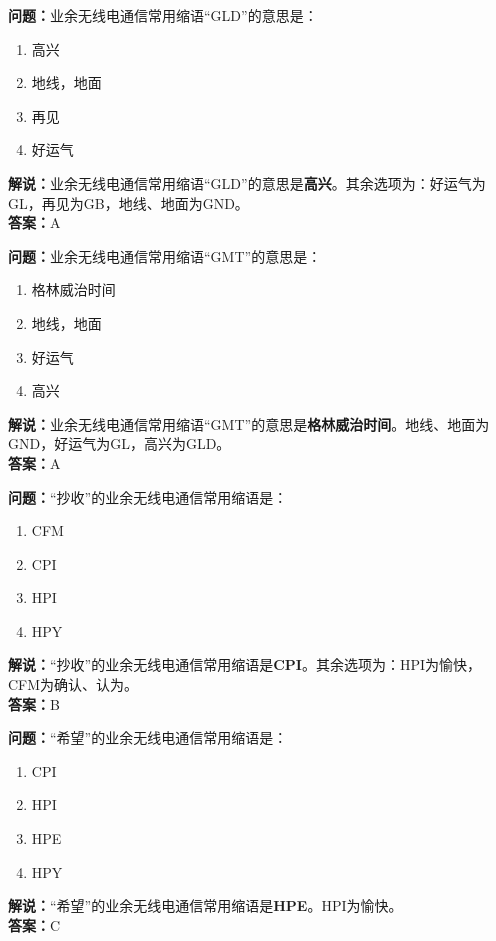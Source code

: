 \bigskip


\noindent\textbf{问题：}业余无线电通信常用缩语“GLD”的意思是：
\begin{enumerate}[label=\Alph*), leftmargin=3em]
\item 高兴
\item 地线，地面
\item 再见
\item 好运气
\end{enumerate}
\noindent\textbf{解说：}业余无线电通信常用缩语“GLD”的意思是\textbf{高兴}。其余选项为：好运气为GL，再见为GB，地线、地面为GND。\\\noindent\textbf{答案：}A



\bigskip


\noindent\textbf{问题：}业余无线电通信常用缩语“GMT”的意思是：
\begin{enumerate}[label=\Alph*), leftmargin=3em]
\item 格林威治时间
\item 地线，地面
\item 好运气
\item 高兴
\end{enumerate}
\noindent\textbf{解说：}业余无线电通信常用缩语“GMT”的意思是\textbf{格林威治时间}。地线、地面为GND，好运气为GL，高兴为GLD。\\\noindent\textbf{答案：}A



\bigskip


\noindent\textbf{问题：}“抄收”的业余无线电通信常用缩语是：
\begin{enumerate}[label=\Alph*), leftmargin=3em]
\item CFM
\item CPI
\item HPI
\item HPY
\end{enumerate}
\noindent\textbf{解说：}“抄收”的业余无线电通信常用缩语是\textbf{CPI}。其余选项为：HPI为愉快，CFM为确认、认为。\\\noindent\textbf{答案：}B



\bigskip


\noindent\textbf{问题：}“希望”的业余无线电通信常用缩语是：
\begin{enumerate}[label=\Alph*), leftmargin=3em]
\item CPI
\item HPI
\item HPE
\item HPY
\end{enumerate}
\noindent\textbf{解说：}“希望”的业余无线电通信常用缩语是\textbf{HPE}。HPI为愉快。\\\noindent\textbf{答案：}C



